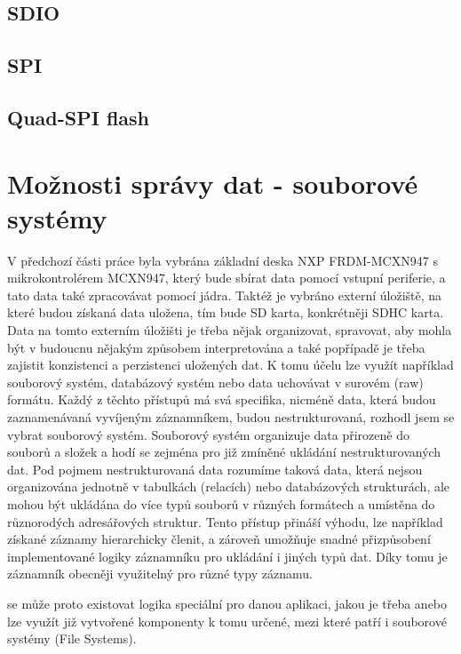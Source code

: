 \subsection{SDIO}

\subsection{SPI}

\subsection{Quad-SPI flash}


\section{Možnosti správy dat - souborové systémy}
V předchozí části práce byla vybrána základní deska NXP FRDM-MCXN947 s mikrokontrolérem MCXN947, který bude sbírat data pomocí vstupní periferie, a tato data také zpracovávat pomocí jádra. Taktéž je vybráno externí úložiště, na které budou získaná data uložena, tím bude SD karta, konkrétněji SDHC karta. Data na tomto externím úložišti je třeba nějak organizovat, spravovat, aby mohla být v budoucnu nějakým způsobem interpretována a také popřípadě je třeba zajistit konzistenci a perzistenci uložených dat. K tomu účelu lze využít například souborový systém, databázový systém nebo data uchovávat v surovém (raw) formátu. Každý z těchto přístupů má svá specifika, nicméně data, která budou zaznamenávaná vyvíjeným záznamníkem, budou nestrukturovaná, rozhodl jsem se vybrat souborový systém. Souborový systém organizuje data přirozeně do souborů a složek a hodí se zejména pro již zmíněné ukládání nestrukturovaných dat. Pod pojmem nestrukturovaná data rozumíme taková data, která nejsou organizována jednotně v tabulkách (relacích) nebo databázových strukturách, ale mohou být ukládána do více typů souborů v různých formátech a umístěna do různorodých adresářových struktur. Tento přístup přináší výhodu, lze například získané záznamy hierarchicky členit, a zároveň umožňuje snadné přizpůsobení implementované logiky záznamníku pro ukládání i jiných typů dat. Díky tomu je záznamník obecněji využitelný pro různé typy záznamu. \cite{weka_structured_unstructured_data, virginia_tech_file_database_systems}

se  může proto existovat logika speciální pro danou aplikaci, jakou je třeba anebo lze využít již vytvořené komponenty k tomu určené, mezi které patří i souborové systémy (File Systems).

